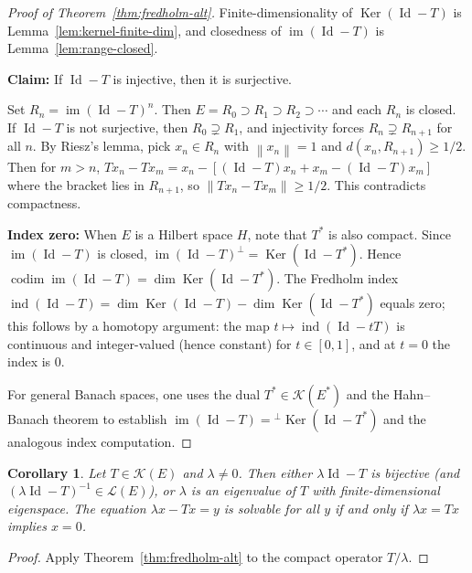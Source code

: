 \documentclass[a4paper,12pt]{book}
\DeclareMathOperator{\im}{im}
\DeclareMathOperator{\Id}{Id}
\DeclareMathOperator{\Ker}{Ker}
\DeclareMathOperator{\codim}{codim}
\newcommand{\norm}[1]{\left\| #1 \right\|}
\theoremstyle{definition}
\theoremstyle{plain}
\newtheorem{corollary}[definition]{Corollary}
\theoremstyle{remark}
\begin{document}
\begin{proof}[Proof of Theorem~\ref{thm:fredholm-alt}]
Finite-dimensionality of $\Ker(\Id - T)$ is Lemma~\ref{lem:kernel-finite-dim},
and closedness of $\im(\Id - T)$ is Lemma~\ref{lem:range-closed}.

\textbf{Claim:} If $\Id - T$ is injective, then it is surjective.

Set $R_n = \im(\Id - T)^n$. Then $E = R_0 \supset R_1 \supset R_2 \supset \cdots$
and each $R_n$ is closed. If $\Id - T$ is not surjective, then
$R_0 \supsetneq R_1$, and injectivity forces $R_n \supsetneq R_{n+1}$ for all $n$.
By Riesz's lemma, pick $x_n \in R_n$ with $\norm{x_n} = 1$ and
$d(x_n, R_{n+1}) \ge 1/2$. Then for $m > n$,
$Tx_n - Tx_m = x_n - [(\Id - T)x_n + x_m - (\Id - T)x_m]$ where the bracket
lies in $R_{n+1}$, so $\norm{Tx_n - Tx_m} \ge 1/2$. This contradicts compactness.

\textbf{Index zero:} When $E$ is a Hilbert space $H$, note that $T^*$ is also
compact. Since $\im(\Id - T)$ is closed,
$\im(\Id - T)^\perp = \Ker(\Id - T^*)$. Hence
$\codim \im(\Id - T) = \dim \Ker(\Id - T^*)$. The Fredholm index
$\operatorname{ind}(\Id - T) = \dim \Ker(\Id - T) - \dim \Ker(\Id - T^*)$
equals zero; this follows by a homotopy argument: the map
$t \mapsto \operatorname{ind}(\Id - tT)$ is continuous and integer-valued (hence
constant) for $t \in [0,1]$, and at $t = 0$ the index is $0$.

For general Banach spaces, one uses the dual $T^* \in \mathcal{K}(E^*)$ and the
Hahn--Banach theorem to establish
$\im(\Id - T) = {}^\perp\!\Ker(\Id - T^*)$ and the analogous index computation.
\end{proof}


\begin{corollary}\label{cor:fredholm-equations}
Let $T \in \mathcal{K}(E)$ and $\lambda \ne 0$. Then either $\lambda\Id - T$ is
bijective (and $(\lambda\Id - T)^{-1} \in \mathcal{L}(E)$), or $\lambda$ is an
eigenvalue of $T$ with finite-dimensional eigenspace. The equation
$\lambda x - Tx = y$ is solvable for all $y$ if and only if $\lambda x = Tx$
implies $x = 0$.
\end{corollary}

\begin{proof}
Apply Theorem~\ref{thm:fredholm-alt} to the compact operator $T/\lambda$.
\end{proof}
\end{document}
